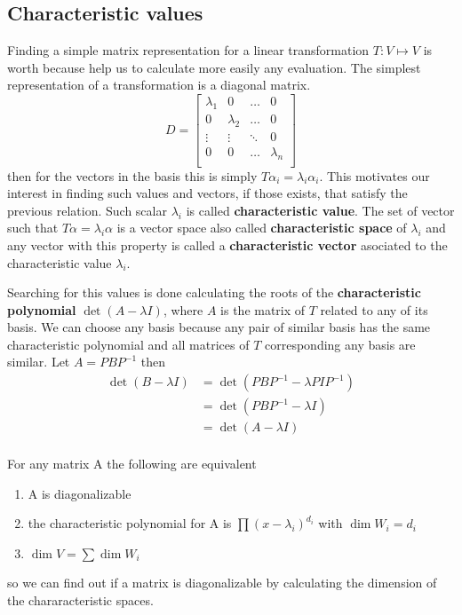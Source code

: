 \documentclass[../../../main.tex]{subfiles}
\begin{document}
\subsection{Characteristic values}
Finding a simple matrix representation for a linear transformation $T:V\mapsto V$ is worth because help us to calculate more easily any evaluation. The simplest representation of a transformation is a diagonal matrix.
\begin{equation*}
    D = \begin{bmatrix}
        \lambda_1 & 0 & \dots & 0\\
        0 & \lambda_2 & \dots & 0\\
        \vdots & \vdots & \ddots & 0\\
        0 & 0 & \dots & \lambda_n\\
    \end{bmatrix}
\end{equation*}
then for the vectors in the basis this is simply $T\alpha_i = \lambda_i \alpha_i$. This motivates our interest in finding such values and vectors, if those exists, that satisfy the previous relation. Such scalar $\lambda_i$ is called \textbf{characteristic value}. The set of vector such that $T\alpha = \lambda_i \alpha$ is a vector space also called \textbf{characteristic space} of $\lambda_i$ and any vector with this property is called a \textbf{characteristic vector} asociated to the characteristic value $\lambda_i$.

Searching for this values is done calculating the roots of the \textbf{characteristic polynomial} $\det(A-\lambda I)$, where $A$ is the matrix of $T$ related to any of its basis. We can choose any basis because any pair of similar basis has the same characteristic polynomial and all matrices of $T$ corresponding any basis are similar. Let $A = PBP^{-1}$ then
\begin{align*}
    \det(B-\lambda I) 
    &= \det(PBP^{-1}-\lambda PIP^{-1})\\
    &= \det(PBP^{-1}-\lambda I)\\
    &= \det(A-\lambda I)\\
\end{align*}

For any matrix A the following are equivalent
\begin{enumerate}
    \item A is diagonalizable
    \item the characteristic polynomial for A is $\prod(x-\lambda_i)^{d_i}$ with $\dim W_i = d_i$
    \item $\dim V = \sum \dim W_i$
\end{enumerate}
so we can find out if a matrix is diagonalizable by calculating the dimension of the chararacteristic spaces.
\end{document}
